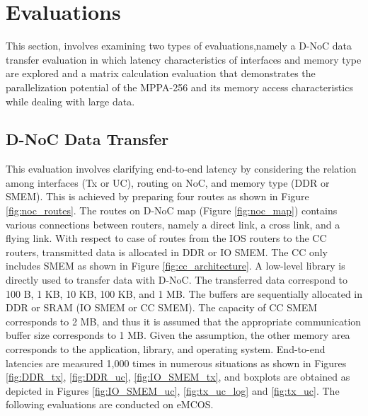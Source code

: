 \documentclass{sig-alternate-05-2015}
\begin{document}

\section{Evaluations}
\label{sec:evaluations}
This section, involves examining two types of evaluations,namely a D-NoC data transfer evaluation in which latency characteristics of interfaces and memory type are explored and a matrix calculation evaluation that demonstrates the parallelization potential of the MPPA-256 and its memory access characteristics while dealing with large data.

\subsection{D-NoC Data Transfer}
\label{sec:dnoc_eval}
This evaluation involves clarifying end-to-end latency by considering the relation among interfaces (Tx or UC), routing on NoC, and memory type (DDR or SMEM).
This is achieved by preparing four routes as shown in Figure \ref{fig:noc_routes}.
The routes on D-NoC map (Figure \ref{fig:noc_map}) contains various connections between routers, namely a direct link, a cross link, and a flying link.
With respect to case of routes from the IOS routers to the CC routers, transmitted data is allocated in DDR or IO SMEM.
The CC only includes SMEM as shown in Figure \ref{fig:cc_architecture}.
A low-level library is directly used to transfer data with D-NoC.
The transferred data correspond to 100 B, 1 KB, 10 KB, 100 KB, and 1 MB.
The buffers are sequentially allocated in DDR or SRAM (IO SMEM or CC SMEM).
The capacity of CC SMEM corresponds to 2 MB, and thus it is assumed that the appropriate communication buffer size corresponds to 1 MB.
Given the assumption, the other memory area corresponds to the application, library, and operating system.
End-to-end latencies are measured 1,000 times in numerous situations as shown in Figures \ref{fig:DDR_tx}, \ref{fig:DDR_uc}, \ref{fig:IO_SMEM_tx}, and boxplots are obtained as depicted in Figures \ref{fig:IO_SMEM_uc}, \ref{fig:tx_uc_log} and \ref{fig:tx_uc}.
The following evaluations are conducted on eMCOS.
\end{document}
